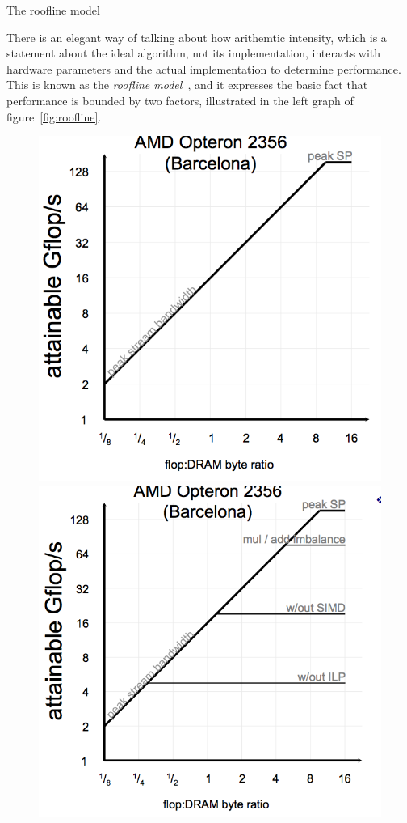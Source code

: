  {The roofline model}
\label{sec:roofline}

There is an elegant way of talking about how arithemtic intensity,
which is a statement about the ideal algorithm, not its implementation,
interacts with hardware parameters and the actual implementation
to determine performance.
This is known as the \emph{roofline model}~\cite{Williams:2009:roofline},
and it expresses the basic fact that performance is bounded by two factors,
illustrated in the left graph of figure~\ref{fig:roofline}.
\begin{figure}[p]

  \includegraphics[scale=.1]{graphics-public/roofline1}
  \includegraphics[scale=.1]{graphics-public/roofline2}

\end{figure}
